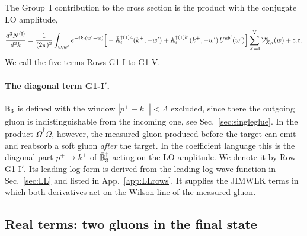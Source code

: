 The Group~I contribution to the cross section is the product with the conjugate LO amplitude,
\begin{equation}
\frac{d^3N^{\rm (I)}}{d^3k}=\frac{1}{(2\pi)^3}\int_{w,w'}e^{-ik\cdot(w'-w)}\Big[-\bar{\mathbb{A}}^{\dagger(1)a}_i(k^+,-w')+\mathbb{A}^{\dagger(1)b'}_i(k^+,-w')\,U^{ab'}(w')\Big]\sum_{X={\rm I}}^{\rm V}\mathcal V^a_{X,i}(w)+{\rm c.c.}
\label{eq:CS1}
\end{equation}
We call the five terms Rows G1-I to G1-V.

\paragraph*{The diagonal term G1-I$'$.} $\mathbb{B}_3$ is defined with the window $|p^+-k^+|<\Lambda$ excluded, since there the outgoing gluon is indistinguishable from the incoming one, see Sec.~\ref{sec:singleglue}. In the product $\bar\Omega^\dagger\Omega$, however, the measured gluon produced before the target can emit and reabsorb a soft gluon \emph{after} the target. In the coefficient language this is the diagonal part $p^+\to k^+$ of $\bar{\mathbb{B}}^\dagger_3$ acting on the LO amplitude. We denote it by Row G1-I$'$. Its leading-log form is derived from the leading-log wave function in Sec.~\ref{sec:LL} and listed in App.~\ref{app:LLrows}. It supplies the JIMWLK terms in which both derivatives act on the Wilson line of the measured gluon.

\subsection{Real terms: two gluons in the final state}\label{sec:groupII}

